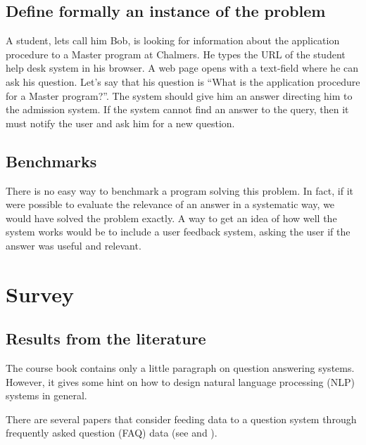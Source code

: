 \documentclass[a4paper,11pt]{article}
\begin{document}
\subsection{Define formally an instance of the problem}
A student, lets call him Bob, is looking for information about the application
procedure to a Master program at Chalmers. He types the URL of the student help
desk system in his browser. A web page opens with a text-field where he can ask
his question. Let's say that his question is ``What is the application procedure
for a Master program?''. The system should give him an answer directing him to
the admission system. If the system cannot find an answer to the query, then it
must notify the user and ask him for a new question.

\subsection{Benchmarks}
There is no easy way to benchmark a program solving this problem. In fact, if it
were possible to evaluate the relevance of an answer in a systematic way, we would
have solved the problem exactly. A way to get an idea of how well the system works
would be to include a user feedback system, asking the user if the answer was
useful and relevant.

\section{Survey}
\subsection{Results from the literature}
The course book \cite{aimodern} contains only a little paragraph on question
answering systems. However, it gives some hint on how to design natural language
processing (NLP) systems in general.

There are several papers that consider feeding data to a question system through
frequently asked question (FAQ) data (see \cite{evaluatingqasusingfaq} and
\cite{faqfindersys}).
\end{document}
